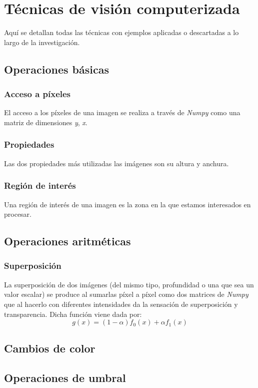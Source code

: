 \chapter{Técnicas de visión computerizada}
Aquí se detallan todas las técnicas con ejemplos aplicadas o
descartadas a lo largo de la investigación.
\section{Operaciones básicas}
\subsection{Acceso a píxeles}
El acceso a los píxeles de una imagen se realiza a través de
\emph{Numpy} como una matriz de dimensiones \emph{y}, \emph{x}.

\subsection{Propiedades}
Las dos propiedades más utilizadas las imágenes son su altura y anchura.

\subsection{Región de interés}
Una región de interés de una imagen es la zona en la que estamos
interesados en procesar.

\section{Operaciones aritméticas}
\subsection{Superposición}
La superposición de dos imágenes (del mismo tipo, profundidad o una
que sea un valor escalar) se produce al sumarlas píxel a píxel
como dos matrices de \emph{Numpy} que al hacerlo con diferentes
intensidades da la sensación de superposición y transparencia. Dicha función viene dada por:
\begin{equation*}
g(x) = (1 - \alpha)f_0(x) + \alpha f_1(x)
\end{equation*}

\section{Cambios de color}

\section{Operaciones de umbral}
